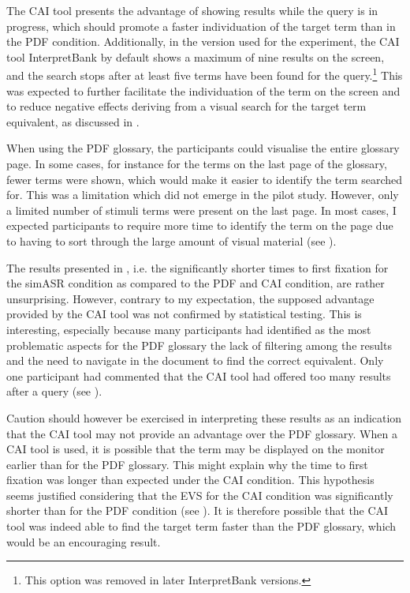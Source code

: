 The CAI tool presents the advantage of showing results while the query is in progress, which should promote a faster individuation of the target term than in the PDF condition. Additionally, in the version used for the experiment, the CAI tool InterpretBank by default shows a maximum of nine results on the screen, and the search stops after at least five terms have been found for the query.\footnote{This option was removed in later InterpretBank versions.} This was expected to further facilitate the individuation of the term on the screen and to reduce negative effects deriving from a visual search for the target term equivalent, as discussed in .

When using the PDF glossary, the participants could visualise the entire glossary page. In some cases, for instance for the terms on the last page of the glossary, fewer terms were shown, which would make it easier to identify the term searched for. This was a limitation which did not emerge in the pilot study. However, only a limited number of stimuli terms were present on the last page. In most cases, I expected participants to require more time to identify the term on the page due to having to sort through the large amount of visual material (see ).

The results presented in , i.e. the significantly shorter times to first fixation for the simASR condition as compared to the PDF and CAI condition, are rather unsurprising. However, contrary to my expectation, the supposed advantage provided by the CAI tool was not confirmed by statistical testing. This is interesting, especially because many participants had identified as the most problematic aspects for the PDF glossary the lack of filtering among the results and the need to navigate in the document to find the correct equivalent. Only one participant had commented that the CAI tool had offered too many results after a query (see ).

Caution should however be exercised in interpreting these results as an indication that the CAI tool may not provide an advantage over the PDF glossary. When a CAI tool is used, it is possible that the term may be displayed on the monitor earlier than for the PDF glossary. This might explain why the time to first fixation was longer than expected under the CAI condition. This hypothesis seems justified considering that the EVS for the CAI condition was significantly shorter than for the PDF condition (see ). It is therefore possible that the CAI tool was indeed able to find the target term faster than the PDF glossary, which would be an encouraging result.

